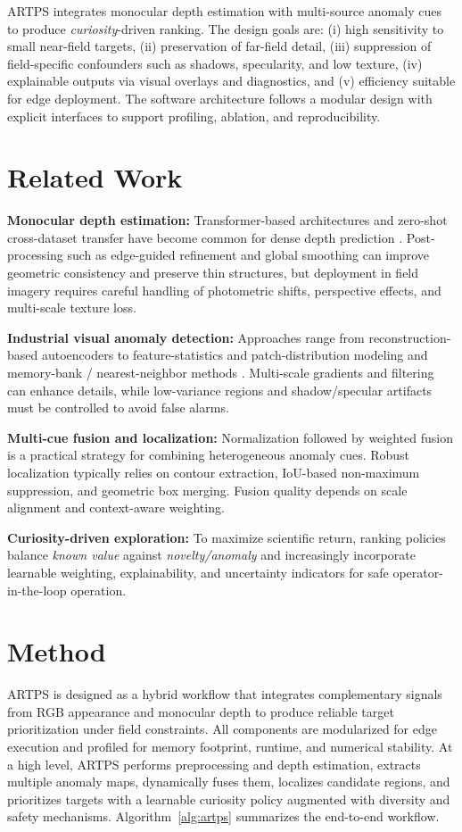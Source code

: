 \documentclass[12pt]{article}
\begin{document}
ARTPS integrates monocular depth estimation with multi-source anomaly cues to produce \emph{curiosity}-driven ranking. The design goals are: (i) high sensitivity to small near-field targets, (ii) preservation of far-field detail, (iii) suppression of field-specific confounders such as shadows, specularity, and low texture, (iv) explainable outputs via visual overlays and diagnostics, and (v) efficiency suitable for edge deployment. The software architecture follows a modular design with explicit interfaces to support profiling, ablation, and reproducibility.

\section{Related Work}
\textbf{Monocular depth estimation:} Transformer-based architectures and zero-shot cross-dataset transfer have become common for dense depth prediction \cite{dosovitskiy2021image,liu2021swin,ranftl2020towards}. Post-processing such as edge-guided refinement and global smoothing can improve geometric consistency and preserve thin structures, but deployment in field imagery requires careful handling of photometric shifts, perspective effects, and multi-scale texture loss.

\textbf{Industrial visual anomaly detection:} Approaches range from reconstruction-based autoencoders to feature-statistics and patch-distribution modeling \cite{defard2021padim} and memory-bank / nearest-neighbor methods \cite{roth2021towards}. Multi-scale gradients and filtering can enhance details, while low-variance regions and shadow/specular artifacts must be controlled to avoid false alarms.

\textbf{Multi-cue fusion and localization:} Normalization followed by weighted fusion is a practical strategy for combining heterogeneous anomaly cues. Robust localization typically relies on contour extraction, IoU-based non-maximum suppression, and geometric box merging. Fusion quality depends on scale alignment and context-aware weighting.

\textbf{Curiosity-driven exploration:} To maximize scientific return, ranking policies balance \emph{known value} against \emph{novelty/anomaly} and increasingly incorporate learnable weighting, explainability, and uncertainty indicators for safe operator-in-the-loop operation.

\section{Method}
ARTPS is designed as a hybrid workflow that integrates complementary signals from RGB appearance and monocular depth to produce reliable target prioritization under field constraints. All components are modularized for edge execution and profiled for memory footprint, runtime, and numerical stability. At a high level, ARTPS performs preprocessing and depth estimation, extracts multiple anomaly maps, dynamically fuses them, localizes candidate regions, and prioritizes targets with a learnable curiosity policy augmented with diversity and safety mechanisms. Algorithm~\ref{alg:artps} summarizes the end-to-end workflow.
\end{document}
